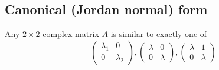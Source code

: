\documentclass[a4paper]{article}
\begin{document}
      \subsection{Canonical (Jordan normal) form}
      \begin{thm}
        Any $2\times 2$ complex matrix $A$ is similar to exactly one of
        \[
          \begin{pmatrix}
            \lambda_1 & 0\\
            0 & \lambda_2
          \end{pmatrix},
          \begin{pmatrix}
            \lambda & 0\\
            0 & \lambda
          \end{pmatrix},
          \begin{pmatrix}
            \lambda & 1\\
            0 & \lambda
          \end{pmatrix}
        \]
      \end{thm}
\end{document}
